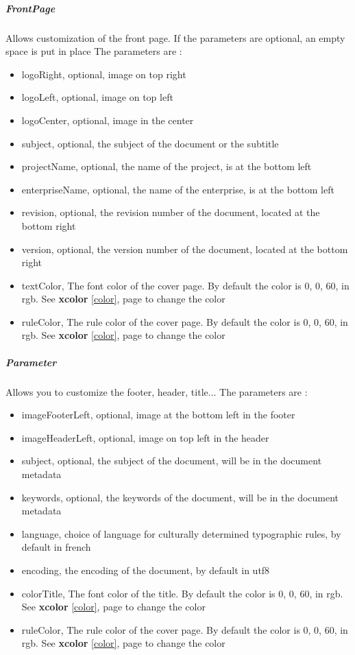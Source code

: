 \subparagraph{FrontPage}
Allows customization of the front page. If the parameters are optional, an empty space is put in place
The parameters are :
\begin{itemize}
    \item logoRight, optional, image on top right
    \item logoLeft, optional, image on top left
    \item logoCenter, optional, image in the center
    \item subject, optional, the subject of the document or the subtitle
    \item projectName, optional, the name of the project, is at the bottom left
    \item enterpriseName, optional, the name of the enterprise, is at the bottom left
    \item revision, optional, the revision number of the document, located at the bottom right
    \item version, optional, the version number of the document, located at the bottom right
    \item textColor, The font color of the cover page. By default the color is 0, 0, 60, in rgb. See \textbf{xcolor} \ref{color}, page \pageref{color} to change the color
    \item ruleColor, The rule color of the cover page. By default the color is 0, 0, 60, in rgb. See \textbf{xcolor} \ref{color}, page \pageref{color} to change the color
\end{itemize}

\subparagraph{Parameter}
Allows you to customize the footer, header, title...
The parameters are :
\begin{itemize}
    \item imageFooterLeft, optional, image at the bottom left in the footer
    \item imageHeaderLeft, optional, image on top left in the header
    \item subject, optional, the subject of the document, will be in the document metadata
    \item keywords, optional, the keywords of the document, will be in the document metadata
    \item language, choice of language for culturally determined typographic rules, by default in french \label{language}
    \item encoding, the encoding of the document, by default in utf8
    \item colorTitle, The font color of the title. By default the color is 0, 0, 60, in rgb. See \textbf{xcolor} \ref{color}, page \pageref{color} to change the color
    \item ruleColor, The rule color of the cover page. By default the color is 0, 0, 60, in rgb. See \textbf{xcolor} \ref{color}, page \pageref{color} to change the color
\end{itemize}


